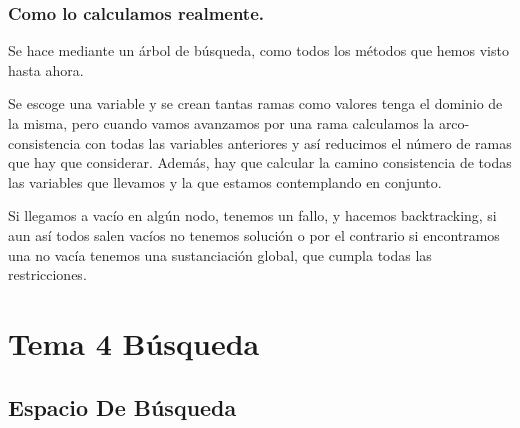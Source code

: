 \documentclass[12pt, twoside, openright]{report} %
\begin{document}
\subsection{Como lo calculamos realmente.}


Se hace mediante un árbol de búsqueda, como todos los métodos que
hemos visto hasta ahora.


Se escoge una variable y se crean tantas ramas como valores tenga el
dominio de la misma, pero cuando vamos avanzamos por una rama
calculamos la arco-consistencia con todas las variables anteriores y
así reducimos el número de ramas que hay que considerar. Además, hay
que calcular la camino consistencia de todas las variables que
llevamos y la que estamos contemplando en conjunto.

Si llegamos a vacío en algún nodo, tenemos un fallo, y hacemos
backtracking, si aun así todos salen vacíos no tenemos solución o
por el contrario si encontramos una no vacía tenemos una
sustanciación global, que cumpla todas las restricciones.



\chapter{Tema 4 Búsqueda}

\section{Espacio De Búsqueda}
\end{document}
